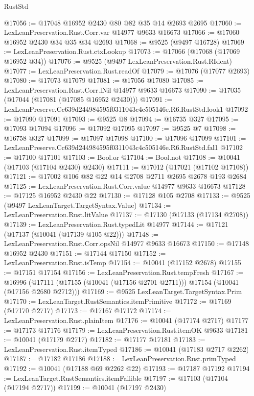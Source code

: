 \begin{lexlean}{RustStd}
\begin{coremodule}
@17056 := @17048 @16952 @2430 @80 @82 @35 @14 @2693 @2695
@17060 := LexLeanPreservation.Rust.Corr.var @14977 @9633 @16673
@17066 := @17060 @16952 @2430 @34 @35 @34 @2693
@17068 := @9525 (@9497 @16728)
@17069 := LexLeanPreservation.Rust.ctxLookup
@17073 := @17066 (@17068 (@17069 @16952 @34))
@17076 := @9525 (@9497 LexLeanPreservation.Rust.RIdent)
@17077 := LexLeanPreservation.Rust.readOf
@17079 := @17076 (@17077 @2693)
@17080 := @17073 @17079
@17081 := @17056 @17080
@17085 := LexLeanPreservation.Rust.Corr.lNil @14977 @9633 @16673
@17090 := @17035 (@17044 (@17081 (@17085 @16952 @2430)))
@17091 := LexLeanPreserve.Cc639d244984595f0311043c4c505146e.R6.RustStd.look1
@17092 := @17090 @17091
@17093 := @9525 @8
@17094 := @16735 @327
@17095 := @17093 @17094
@17096 := @17092 @17095
@17097 := @9525 @7
@17098 := @16758 @327
@17099 := @17097 @17098
@17100 := @17096 @17099
@17101 := LexLeanPreserve.Cc639d244984595f0311043c4c505146e.R6.RustStd.fal1
@17102 := @17100 @17101
@17103 := Bool.or
@17104 := Bool.not
@17108 := @10041 (@17103 (@17104 @2430) @2430)
@17111 := @17012 (@17021 (@17102 @17108))
@17121 := @17002 @106 @82 @22 @14 @2708 @2711 @2695 @2678 @193 @2684
@17125 := LexLeanPreservation.Rust.Corr.value @14977 @9633 @16673
@17128 := @17125 @16952 @2430 @22
@17130 := @17128 @105 @2708
@17133 := @9525 (@9497 LexLeanTarget.TargetSyntax.Value)
@17134 := LexLeanPreservation.Rust.litValue
@17137 := @17130 (@17133 (@17134 @2708))
@17139 := LexLeanPreservation.Rust.typedLit @14977
@17144 := @17121 (@17137 (@10041 (@17139 @105 @22)))
@17148 := LexLeanPreservation.Rust.Corr.opsNil @14977 @9633 @16673
@17150 := @17148 @16952 @2430
@17151 := @17144 @17150
@17152 := LexLeanPreservation.Rust.isTemp
@17154 := @10041 (@17152 @2678)
@17155 := @17151 @17154
@17156 := LexLeanPreservation.Rust.tempFresh
@17167 := @16996
    (@17111 (@17155 (@10041 (@17156 @2701 @2711))) @17154 (@10041 (@17156 @2680 @2712)))
@17169 := @9525 LexLeanTarget.TargetSyntax.Prim
@17170 := LexLeanTarget.RustSemantics.itemPrimitive
@17172 := @17169 (@17170 @2717)
@17173 := @17167 @17172
@17174 := LexLeanPreservation.Rust.plainItem
@17176 := @10041 (@17174 @2717)
@17177 := @17173 @17176
@17179 := LexLeanPreservation.Rust.itemOK @9633
@17181 := @10041 (@17179 @2717)
@17182 := @17177 @17181
@17183 := LexLeanPreservation.Rust.itemTyped
@17186 := @10041 (@17183 @2717 @2262)
@17187 := @17182 @17186
@17188 := LexLeanPreservation.Rust.primTyped
@17192 := @10041 (@17188 @69 @2262 @22)
@17193 := @17187 @17192
@17194 := LexLeanTarget.RustSemantics.itemFallible
@17197 := @17103 (@17104 (@17194 @2717))
@17199 := @10041 (@17197 @2430)

\end{coremodule}
\end{lexlean}
